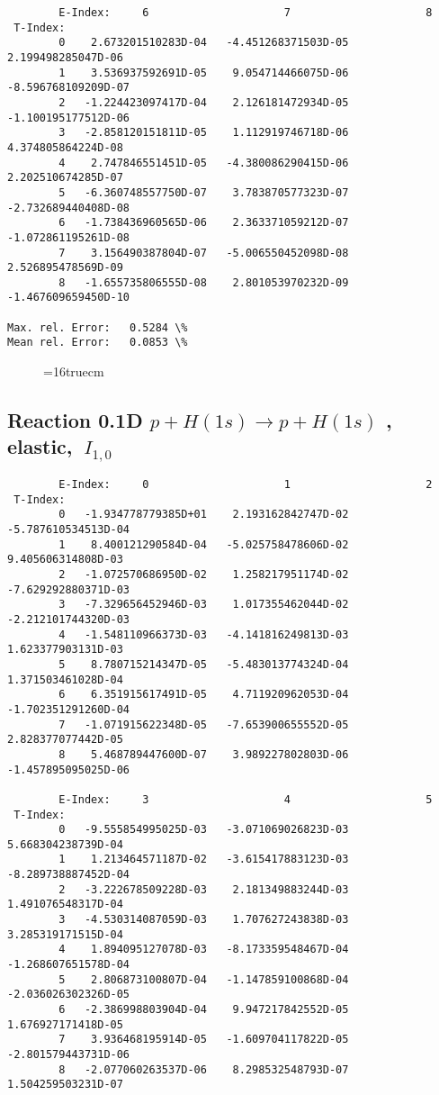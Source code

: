 \documentclass[12pt,dvipdfmx]{article}
\begin{document}
{\begin{small}
\begin{verbatim}
        E-Index:     6                     7                     8
 T-Index:
        0    2.673201510283D-04   -4.451268371503D-05    2.199498285047D-06
        1    3.536937592691D-05    9.054714466075D-06   -8.596768109209D-07
        2   -1.224423097417D-04    2.126181472934D-05   -1.100195177512D-06
        3   -2.858120151811D-05    1.112919746718D-06    4.374805864224D-08
        4    2.747846551451D-05   -4.380086290415D-06    2.202510674285D-07
        5   -6.360748557750D-07    3.783870577323D-07   -2.732689440408D-08
        6   -1.738436960565D-06    2.363371059212D-07   -1.072861195261D-08
        7    3.156490387804D-07   -5.006550452098D-08    2.526895478569D-09
        8   -1.655735806555D-08    2.801053970232D-09   -1.467609659450D-10

Max. rel. Error:   0.5284 \%
Mean rel. Error:   0.0853 \%
\end{verbatim}\end{small}
\begin{figure} \label{0.1T}
\epsfxsize=16truecm
\end{figure}
\newpage


\subsection{
Reaction 0.1D  $p + H(1s) \rightarrow  p + H(1s)$ ,
elastic, $\ I_{1,0}$
}

\begin{small}\begin{verbatim}
        E-Index:     0                     1                     2
 T-Index:
        0   -1.934778779385D+01    2.193162842747D-02   -5.787610534513D-04
        1    8.400121290584D-04   -5.025758478606D-02    9.405606314808D-03
        2   -1.072570686950D-02    1.258217951174D-02   -7.629292880371D-03
        3   -7.329656452946D-03    1.017355462044D-02   -2.212101744320D-03
        4   -1.548110966373D-03   -4.141816249813D-03    1.623377903131D-03
        5    8.780715214347D-05   -5.483013774324D-04    1.371503461028D-04
        6    6.351915617491D-05    4.711920962053D-04   -1.702351291260D-04
        7   -1.071915622348D-05   -7.653900655552D-05    2.828377077442D-05
        8    5.468789447600D-07    3.989227802803D-06   -1.457895095025D-06

        E-Index:     3                     4                     5
 T-Index:
        0   -9.555854995025D-03   -3.071069026823D-03    5.668304238739D-04
        1    1.213464571187D-02   -3.615417883123D-03   -8.289738887452D-04
        2   -3.222678509228D-03    2.181349883244D-03    1.491076548317D-04
        3   -4.530314087059D-03    1.707627243838D-03    3.285319171515D-04
        4    1.894095127078D-03   -8.173359548467D-04   -1.268607651578D-04
        5    2.806873100807D-04   -1.147859100868D-04   -2.036026302326D-05
        6   -2.386998803904D-04    9.947217842552D-05    1.676927171418D-05
        7    3.936468195914D-05   -1.609704117822D-05   -2.801579443731D-06
        8   -2.077060263537D-06    8.298532548793D-07    1.504259503231D-07


\end{verbatim}
\end{small}}
\end{document}
